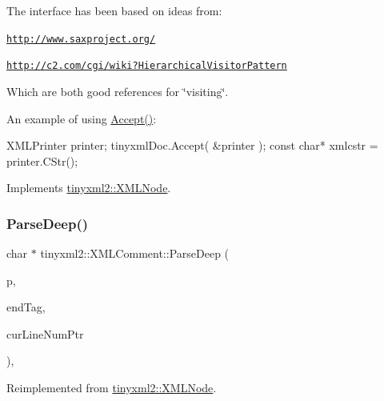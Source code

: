 The interface has been based on ideas from\+:


\begin{DoxyItemize}
\item \href{http://www.saxproject.org/}{\tt http\+://www.\+saxproject.\+org/}
\item \href{http://c2.com/cgi/wiki?HierarchicalVisitorPattern}{\tt http\+://c2.\+com/cgi/wiki?\+Hierarchical\+Visitor\+Pattern}
\end{DoxyItemize}

Which are both good references for \char`\"{}visiting\char`\"{}.

An example of using \hyperlink{classtinyxml2_1_1_x_m_l_comment_a27b37d16cea01b5329dfbbb4f9508e39}{Accept()}\+: \begin{DoxyVerb}XMLPrinter printer;
tinyxmlDoc.Accept( &printer );
const char* xmlcstr = printer.CStr();
\end{DoxyVerb}
 

Implements \hyperlink{classtinyxml2_1_1_x_m_l_node_a81e66df0a44c67a7af17f3b77a152785}{tinyxml2\+::\+X\+M\+L\+Node}.

\mbox{\label{classtinyxml2_1_1_x_m_l_comment_ae61ea28c1ba2e092ba4c63c088ce6474}} 
\subsubsection{\texorpdfstring{Parse\+Deep()}{ParseDeep()}}
{\footnotesize\ttfamily char $\ast$ tinyxml2\+::\+X\+M\+L\+Comment\+::\+Parse\+Deep (\begin{DoxyParamCaption}\item[{char $\ast$}]{p,  }\item[{\hyperlink{classtinyxml2_1_1_str_pair}{Str\+Pair} $\ast$}]{end\+Tag,  }\item[{int $\ast$}]{cur\+Line\+Num\+Ptr }\end{DoxyParamCaption})\hspace{0.3cm}{\ttfamily [protected]}, {\ttfamily [virtual]}}



Reimplemented from \hyperlink{classtinyxml2_1_1_x_m_l_node_a0afc27892998f31735f6225edb40a40d}{tinyxml2\+::\+X\+M\+L\+Node}.

\mbox{\label{classtinyxml2_1_1_x_m_l_comment_adf5b5c0319351dcc339df098d11e8fb2}} 
